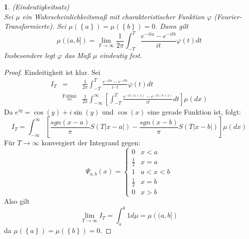 \documentclass[10pt,a4paper]{report}
\numberwithin{equation}{section}
\numberwithin{figure}{section}
\theoremstyle{plain}
\theoremstyle{definition}
\theoremstyle{remark}
\theoremstyle{plain}
\newtheorem{prop}[thm]{\protect\propositionname}
\providecommand{\propositionname}{Satz}
\newcommand{\1}{ \mathbb{1} } %
\begin{document}
\begin{prop} (Eindeutigkeitsatz)\\
Sei $\mu$ ein Wahrscheinlichkeitsmaß mit charakteristischer Funktion
$\varphi$ (Fourier-Transformierte). Sei $\mu\left(\left\{ a\right\} \right)=\mu\left(\left\{ b\right\} \right)=0$.
Dann gilt
\[
\mu\left((a,b]\right)=\lim_{T\to\infty}\frac{1}{2\pi}\int_{-T}^{T}\frac{e^{-ita}-e^{-itb}}{it}\varphi\left(t\right)dt
\]
Insbesondere legt $\varphi$ das Maß $\mu$ eindeutig fest. 
\end{prop}
\begin{proof}
Eindeitigkeit ist klar. Sei 
\begin{eqnarray*}
I_{T} & = & \frac{1}{2\pi}\int_{-T}^{T}\frac{e^{-ita}-e^{-itb}}{i\cdot t}\varphi(t)dt\\
 & \overset{\mbox{Fubini}}{=} & \frac{1}{2\pi}\int_{-\infty}^{\infty}\left[\int_{-T}^{T}\frac{e^{-it\left(a+x\right)}-e^{-it\left(b+x\right)}}{it}dt\right]\mu\left(dx\right)
\end{eqnarray*}
Da $e^{iy}=\cos\left(y\right)+i\sin\left(y\right)$ und $\cos\left(x\right)$
eine gerade Funktion ist, folgt: 
\[
I_{T}=\int_{-\infty}^{\infty}\left[\frac{sgn\left(x-a\right)}{\pi}S\left(T\left|x-a\right|\right)-\frac{sgn\left(x-b\right)}{\pi}S\left(T\left|x-b\right|\right)\right]\mu\left(dx\right)
\]
Für $T\to\infty$ konvergiert der Integrand gegen: 
\[
\Psi_{a,b}\left(x\right)=\begin{cases}
0 & x<a\\
\frac{1}{2} & x=a\\
1 & a<x<b\\
\frac{1}{2} & x=b\\
0 & x>b
\end{cases}
\]
Also gilt 
\[
\lim_{T\to\infty}I_{T}=\int_{a}^{b}1d\mu=\mu\left((a,b]\right)
\]
da $\mu\left(\left\{ a\right\} \right)=\mu\left(\left\{ b\right\} \right)=0$. 
\end{proof}


\printindex
\end{document}
